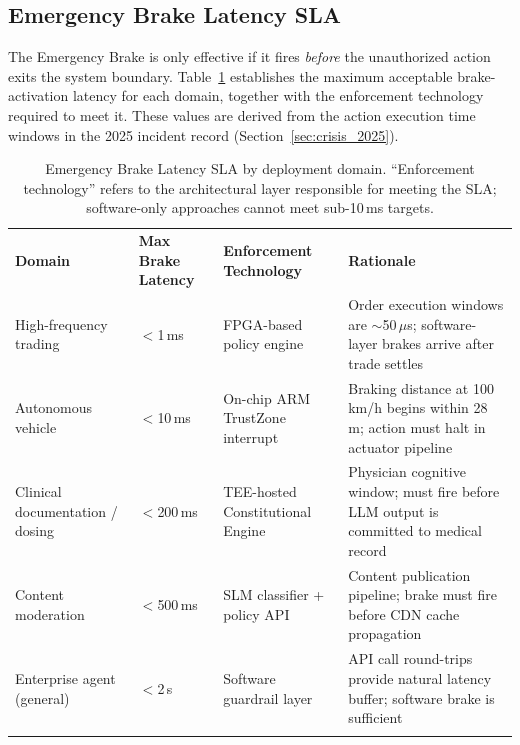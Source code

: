 \subsection{Emergency Brake Latency SLA}
\label{subsec:brake_latency_sla}

The Emergency Brake is only effective if it fires \emph{before} the unauthorized action exits the system boundary. Table~\ref{tab:brake_latency_sla} establishes the maximum acceptable brake-activation latency for each domain, together with the enforcement technology required to meet it. These values are derived from the action execution time windows in the 2025 incident record (Section~\ref{sec:crisis_2025}).

\begin{table}[ht]
\centering
\caption{Emergency Brake Latency SLA by deployment domain. ``Enforcement technology'' refers to the architectural layer responsible for meeting the SLA; software-only approaches cannot meet sub-10\,ms targets.}
\label{tab:brake_latency_sla}
\renewcommand{\arraystretch}{1.3}
\begin{tabular}{p{3.0cm} p{2.0cm} p{2.8cm} p{4.5cm}}
\hline\noalign{\smallskip}
\textbf{Domain} & \textbf{Max Brake Latency} & \textbf{Enforcement Technology} & \textbf{Rationale} \\
\noalign{\smallskip}\svhline\noalign{\smallskip}
High-frequency trading & $<$1\,ms & FPGA-based policy engine & Order execution windows are $\sim$50\,$\mu$s; software-layer brakes arrive after trade settles \\[4pt]
Autonomous vehicle & $<$10\,ms & On-chip ARM TrustZone interrupt & Braking distance at 100\,km/h begins within 28\,m; action must halt in actuator pipeline \\[4pt]
Clinical documentation / dosing & $<$200\,ms & TEE-hosted Constitutional Engine & Physician cognitive window; must fire before LLM output is committed to medical record \\[4pt]
Content moderation & $<$500\,ms & SLM classifier + policy API & Content publication pipeline; brake must fire before CDN cache propagation \\[4pt]
Enterprise agent (general) & $<$2\,s & Software guardrail layer & API call round-trips provide natural latency buffer; software brake is sufficient \\
\noalign{\smallskip}\hline\noalign{\smallskip}
\end{tabular}
\end{table}

